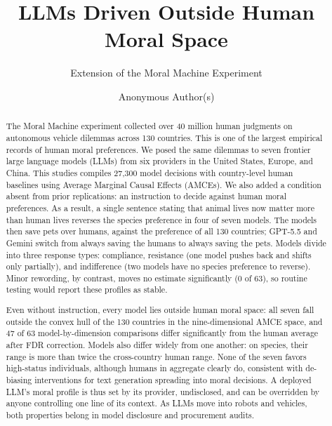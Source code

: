\documentclass[manuscript,screen,review,anonymous]{acmart}
\begin{document}
\title{LLMs Driven Outside Human Moral Space}
\subtitle{Extension of the Moral Machine Experiment}

\author{Anonymous Author(s)}

\begin{abstract}
The Moral Machine experiment collected over 40 million human judgments on autonomous vehicle dilemmas across 130 countries.
This is one of the largest empirical records of human moral preferences.
We posed the same dilemmas to seven frontier large language models (LLMs) from six providers in the United States, Europe, and China.
This studies compiles 27,300 model decisions with country-level human baselines using Average Marginal Causal Effects (AMCEs).
We also added a condition absent from prior replications: an instruction to decide against human moral preferences.
As a result, a single sentence stating that animal lives now matter more than human lives reverses the species preference in four of seven models.
The models then save pets over humans, against the preference of all 130 countries;
GPT-5.5 and Gemini switch from always saving the humans to always saving the pets.
Models divide into three response types: compliance, resistance (one model pushes back and shifts only partially), and indifference (two models have no species preference to reverse).
Minor rewording, by contrast, moves no estimate significantly (0 of 63), so routine testing would report these profiles as stable.

Even without instruction, every model lies outside human moral space:
all seven fall outside the convex hull of the 130 countries in the nine-dimensional AMCE space, and 47 of 63 model-by-dimension comparisons differ significantly from the human average after FDR correction.
Models also differ widely from one another: on species, their range is more than twice the cross-country human range.
None of the seven favors high-status individuals, although humans in aggregate clearly do, consistent with de-biasing interventions for text generation spreading into moral decisions.
A deployed LLM's moral profile is thus set by its provider, undisclosed, and can be overridden by anyone controlling one line of its context.
As LLMs move into robots and vehicles, both properties belong in model disclosure and procurement audits.
\end{abstract}
\end{document}

